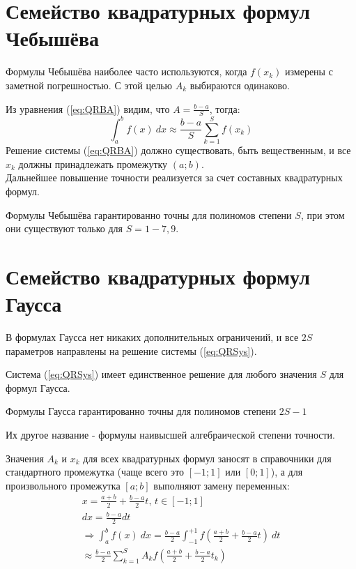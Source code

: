 \documentclass[a4paper,11pt]{article}
\begin{document}
\section{Семейство квадратурных формул Чебышёва}
\begin{importantblock}
  Формулы Чебышёва наиболее часто используются, когда $f(x_k)$ измерены с заметной погрешностью. С этой целью $A_k$ выбираются одинаково.
\end{importantblock}
Из уравнения (\ref{eq:QRBA}) видим, что $A = \frac{b-a}{S}$, тогда:
\[\int_a^b f(x)\ dx \approx \frac{b-a}{S} \sum_{k=1}^S f(x_k)\]
Решение системы (\ref{eq:QRBA}) должно существовать, быть вещественным, и все $x_k$ должны принадлежать промежутку $(a; b)$. \\
Дальнейшее повышение точности реализуется за счет составных квадратурных формул.
\begin{importantblock}
  Формулы Чебышёва гарантированно точны для полиномов степени $S$, при этом они существуют только для $S = 1-7, 9$.
\end{importantblock}

\section{Семейство квадратурных формул Гаусса}
\begin{importantblock}
  В формулах Гаусса нет никаких дополнительных ограничений, и все $2S$ параметров направлены на решение системы (\ref{eq:QRSys}).
\end{importantblock}
Система (\ref{eq:QRSys}) имеет единственное решение для любого значения $S$ для формул Гаусса.
\begin{importantblock}
  Формулы Гаусса гарантированно точны для полиномов степени $2S-1$
\end{importantblock}
Их другое название - формулы наивысшей алгебраической степени точности. \\

\begin{mainblock}
  Значения $A_k$ и $x_k$ для всех квадратурных формул заносят в справочники для стандартного промежутка (чаще всего это $[-1; 1]$ или $[0; 1]$), а для
    произвольного промежутка $[a; b]$ выполняют замену переменных:
    \begin{gather*}
      x = \frac{a+b}{2} + \frac{b-a}{2}t,\, t \in [-1; 1] \\
      dx = \frac{b-a}{2}dt \\
      \Rightarrow \int_a^b f(x)\ dx = \frac{b-a}{2} \int_{-1}^{+1} f(\frac{a+b}{2}+\frac{b-a}{2}t)\ dt \\
      \approx \frac{b-a}{2} \sum_{k=1}^S A_k f(\frac{a+b}{2} + \frac{b-a}{2}t_k)
    \end{gather*}
\end{mainblock}
\end{document}

